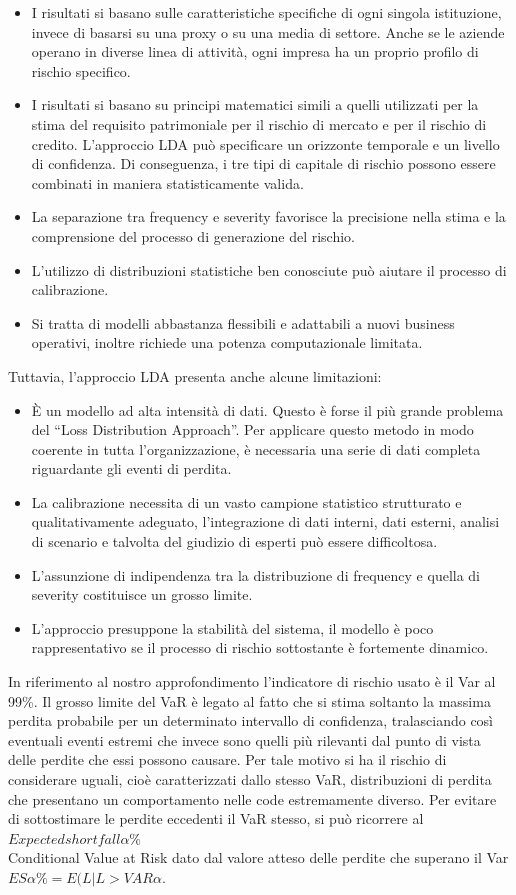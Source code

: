 \documentclass[titlepage]{article}
\begin{document}
\begin{itemize}
{\begin{itemize}
	\item 	I risultati si basano sulle caratteristiche specifiche di ogni singola istituzione, invece di basarsi su una proxy o su una media di settore. Anche se le aziende operano in diverse linea di attività, ogni impresa ha un proprio profilo di rischio specifico.  
	\item 	I risultati si basano su principi matematici simili a quelli utilizzati per la stima del requisito patrimoniale per il rischio di mercato e per il rischio di credito. L'approccio LDA può specificare un orizzonte temporale e un livello di confidenza. Di conseguenza, i tre tipi di capitale di rischio possono essere combinati in maniera statisticamente valida.  
	\item 	La separazione tra frequency e severity favorisce la precisione nella stima e la comprensione del processo di generazione del rischio.  
	\item 	L’utilizzo di distribuzioni statistiche ben conosciute può aiutare il processo di calibrazione.  
	\item 	Si tratta di modelli abbastanza flessibili e adattabili a nuovi business operativi, inoltre richiede una potenza computazionale limitata.
\end{itemize}
	 Tuttavia, l'approccio LDA presenta anche alcune limitazioni: 
	\begin{itemize}
	\item 	È un modello ad alta intensità di dati. Questo è forse il più grande problema del “Loss Distribution Approach”. Per applicare questo metodo in modo coerente in tutta l'organizzazione, è necessaria una serie di dati completa riguardante gli eventi di perdita.  
	\item La calibrazione necessita di un vasto campione statistico strutturato e qualitativamente adeguato, l’integrazione di dati interni, dati esterni, analisi di scenario e talvolta del giudizio di esperti può essere difficoltosa.  
	\item 	L’assunzione di indipendenza tra la distribuzione di frequency e quella di severity costituisce un grosso limite.  
	\item 	L’approccio presuppone la stabilità del sistema, il modello è poco rappresentativo se il processo di rischio sottostante è fortemente dinamico. 
\end{itemize}
In riferimento al nostro approfondimento l’indicatore di rischio usato è il Var al 99\%. Il grosso limite del VaR è legato al fatto che si stima soltanto la massima perdita probabile per un determinato intervallo di confidenza, tralasciando così eventuali eventi estremi che invece sono quelli più rilevanti dal punto di vista delle perdite che essi possono causare. Per tale motivo si ha il rischio di considerare uguali, cioè caratterizzati dallo stesso VaR, distribuzioni di perdita che presentano un comportamento nelle code estremamente diverso. Per evitare di sottostimare le perdite eccedenti il VaR stesso, si può ricorrere al $Expected shortfall\alpha\%$ \\  Conditional Value at Risk dato dal valore atteso delle perdite che superano il Var
$ES\alpha\%=E(L|L>VAR\alpha%
$.




}
\end{itemize}
\end{document}

